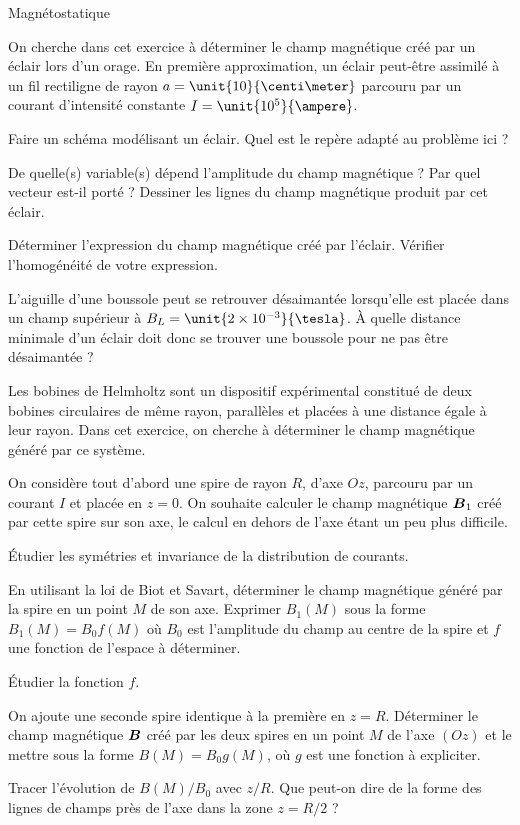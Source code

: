\begin{td}{Magnétostatique}

On cherche dans cet exercice à déterminer le
champ magnétique créé par un éclair lors d'un orage.  En première
approximation, un éclair peut-être assimilé à un fil rectiligne de rayon
$a = \unit{10}{\centi \meter}$ parcouru par un courant d'intensité constante
$I = \unit{10^5}{\ampere}$.  
\begin{exlist} 
	\item Faire un schéma modélisant un éclair. 
	Quel est le repère adapté au problème ici ?  
	\item  
	De quelle(s) variable(s) dépend l'amplitude du champ magnétique ? 
	Par quel vecteur est-il porté ?  
	Dessiner les lignes du champ magnétique produit par cet éclair.
	\item Déterminer l'expression du champ magnétique créé par l'éclair.
	      Vérifier l'homogénéité de votre expression.  
	\item L'aiguille d'une boussole peut se retrouver désaimantée 
	lorsqu'elle est placée dans un champ supérieur à 
	$B_L = \unit{2 \times 10^{-3}}{\tesla}$. À quelle distance minimale d'un
	éclair doit donc se trouver une boussole pour ne pas être désaimantée ?
\end{exlist} 


Les bobines de Helmholtz sont un dispositif expérimental constitué de 
deux bobines circulaires de même rayon, parallèles et placées à une distance
égale à leur rayon. Dans cet exercice, on cherche à déterminer le champ magnétique
généré par ce système.

On considère tout d'abord une spire de rayon $R$, d'axe $Oz$, 
parcouru par un courant $I$ et
placée en $z = 0$.
On souhaite calculer le champ magnétique $\vecb_1$ créé par cette spire sur son axe,
le calcul en dehors de l'axe étant un peu plus difficile.
\begin{exlist}
	\item Étudier les symétries et invariance de la distribution de courants.
	\item En utilisant la loi de Biot et Savart, déterminer le champ magnétique
	  généré par la spire en un point $M$ de son axe. Exprimer $B_1(M)$
	  sous la forme $B_1(M) = B_0 f(M)$ où $B_0$ est l'amplitude
	  du champ au centre de la spire et $f$ une fonction de l'espace à déterminer.
	\item Étudier la fonction $f$.
	\item On ajoute une seconde spire identique à la première en $z = R$. 
	  Déterminer le champ magnétique $\vecb$ créé par les deux spires en un point $M$ 
	  de l'axe $(Oz)$ et le mettre sous la forme $B(M) = B_0g(M)$, où 
	  $g$ est une fonction à expliciter.
  \item Tracer l'évolution de $B(M)/B_0$ avec $z/R$. 
	   Que peut-on dire de la forme des 
	   lignes de champs près de l'axe dans la zone $z = R/2$ ?
\end{exlist}



\end{td}
